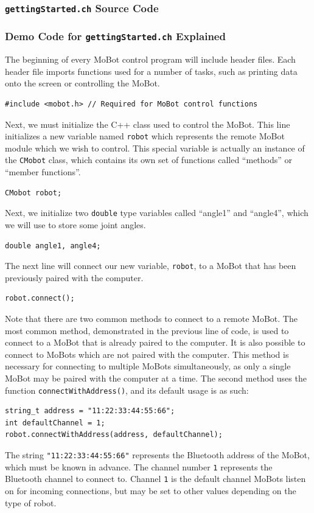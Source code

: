 \documentclass{article}
\begin{document}
\subsubsection{\texttt{gettingStarted.ch} Source Code}


\subsubsection{\label{sec:democode}Demo Code for \texttt{gettingStarted.ch} Explained}
The beginning of every MoBot control program will include header files. Each
header file imports functions used for a number of tasks, such as printing
data onto the screen or controlling the MoBot. 

\begin{verbatim}
#include <mobot.h> // Required for MoBot control functions
\end{verbatim}

Next, we must initialize the C++ class used to control the MoBot. This line
initializes a new variable named \texttt{robot} which represents the remote
MoBot module which we wish to control. This special variable is actually an
instance of the \texttt{CMobot} class, which contains its own set of
functions called ``methods'' or ``member functions''.
\begin{verbatim}
CMobot robot;
\end{verbatim}

Next, we initialize two \texttt{double} type variables called 
``angle1'' and ``angle4'', which we will use to store some joint angles.
\begin{verbatim}
double angle1, angle4;
\end{verbatim}

The next line will connect our new variable, \texttt{robot}, to a
MoBot that has been previously paired with the computer.
\begin{verbatim}
robot.connect();
\end{verbatim}

Note that there are two common methods to connect to a remote MoBot. 
The most common method, demonstrated in the previous line of code, is
used to connect to a MoBot that is already paired to the computer. It
is also possible to connect to MoBots which are not paired with the 
computer. This method is necessary for connecting to multiple
MoBots simultaneously, as only a single MoBot may be paired with the
computer at a time. The second method uses the function
\texttt{connectWithAddress()}, and its default usage is as such:
\begin{verbatim}
string_t address = "11:22:33:44:55:66";
int defaultChannel = 1;
robot.connectWithAddress(address, defaultChannel);
\end{verbatim}
The string \texttt{"11:22:33:44:55:66"} represents the Bluetooth address
of the MoBot, which must be known in advance. The channel number \texttt{1} 
represents the Bluetooth channel to connect to. Channel \texttt{1}
is the default channel MoBots listen on for incoming connections, but
may be set to other values depending on the type of robot.
\end{document}
